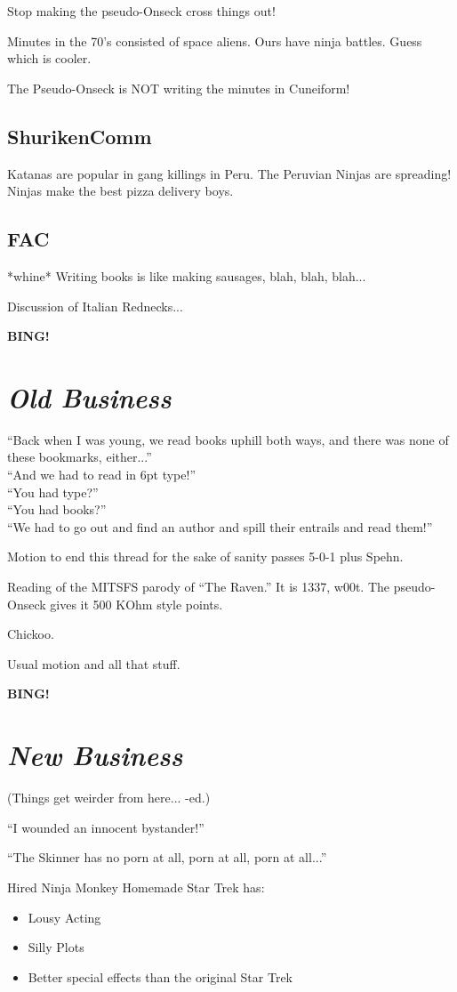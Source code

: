 \documentclass[10pt]{article}
\newcommand{\bing}{{\bf BING!} }
\newcommand{\goto}[1]{\bing \vskip 12pt \section*{{\em{#1}}}}
\newcommand{\ps}{ plus Spehn\xspace}
\begin{document}
Stop making the pseudo-Onseck cross things out!

Minutes in the 70's consisted of space aliens.  Ours have ninja battles. Guess which is cooler.

The Pseudo-Onseck is NOT writing the minutes in Cuneiform!

\subsection*{ShurikenComm}
Katanas are popular in gang killings in Peru.
The Peruvian Ninjas are spreading!
Ninjas make the best pizza delivery boys.

\subsection*{FAC}
*whine*
Writing books is like making sausages, blah, blah, blah...

Discussion of Italian Rednecks...

\goto{Old Business}

``Back when I was young, we read books uphill both ways, and there was none of these bookmarks, 
either...''\\
``And we had to read in 6pt type!''\\
``You had type?''\\
``You had books?''\\
``We had to go out and find an author and spill their entrails and read them!''

Motion to end this thread for the sake of sanity passes 5-0-1\ps.

Reading of the MITSFS parody of ``The Raven.''  It is 1337, w00t.  The pseudo-Onseck gives it 500 
KOhm style points.

Chickoo.

Usual motion and all that stuff.

\goto{New Business}

(Things get weirder from here... -ed.)

``I wounded an innocent bystander!''

``The Skinner has no porn at all, porn at all, porn at all...''

Hired Ninja Monkey Homemade Star Trek has:
\begin{itemize}
\item Lousy Acting
\item Silly Plots
\item Better special effects than the original Star Trek
\end{itemize}
\end{document}
